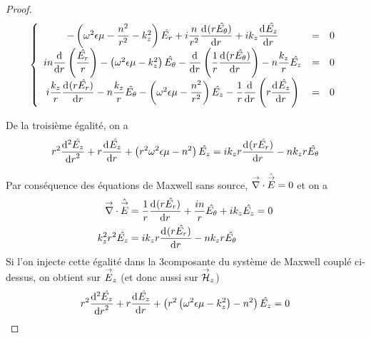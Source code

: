 \begin{proof}

    \begin{equation*}
      \left\lbrace
      \begin{array}{ccc}
        -\left(\w^2\eps\mu -\frac{n^2}{r^2}  - k_z^2\right)\hat{E_r}  +i\frac{n}{r^2}\ddp{r}{(r\hat{E_\theta})}  +i k_z\ddp{r}{\hat{E_z}} & = & 0
        \\
        in\ddp{r}{}\left(\frac{\hat{E_r}}{r}\right) -\left(\w^2\eps\mu - k_z^2\right)\hat{E_\theta} - \ddp{r}{}\left(\frac{1}{r}\ddp{r}{(r\hat{E_\theta})}\right)  - n\frac{k_z}{r}\hat{E_z} & = & 0
        \\
        i\frac{k_z}{r}\ddp{r}{(r\hat{E_r})}  - n\frac{k_z}{r}\hat{E_\theta}  -\left(\w^2\eps\mu - \frac{n^2}{r^2} \right)\hat{E_z} - \frac{1}{r}\ddp{r}{}\left(r\ddp{r}{\hat{E_z}}\right) & = & 0
      \end{array}
      \right.
    \end{equation*}

    De la troisième égalité, on a
    \begin{equation*}
    r^2 \ddp[2]{r}{\hat{E_z}} + r\ddp{r}{\hat{E_z}} + \left(r^2\w^2\eps\mu - n^2\right)\hat{E_z} =ik_zr\ddp{r}{(r\hat{E_r})} -  nk_zr\hat{E_\theta}
    \end{equation*}

    Par conséquence des équations de Maxwell sans source, \(\vdiv \hat \vE = 0\) et on a
    \begin{align*}
      \vdiv\hat \vE &= \frac{1}{r}\ddp{r}{(r\hat{E_r})} + \frac{in}{r}\hat{E_\theta} + ik_z\hat{E_z} = 0
      \\
      k_z^2r^2 \hat{E_z} &= ik_zr\ddp{r}{(r\hat{E_r})} - nk_zr\hat{E_\theta}
    \end{align*}
    Si l'on injecte cette égalité dans la 3\ieme composante du système de Maxwell couplé ci-dessus, on obtient sur \(\vE_z\) (et donc aussi sur \(\vH_z\))
    \begin{equation*}
      r^2 \ddp[2]{r}{\hat{E_z}} + r\ddp{r}{\hat{E_z}} + \left(r^2\left(\w^2\eps\mu - k_z^2\right) - n^2\right)\hat{E_z} = 0
    \end{equation*}


\end{proof}
